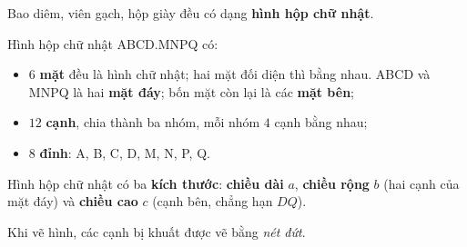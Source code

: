 \gdef\cuboidVT#1#2#3#4{\coordinate (Q) at (0,0); \coordinate (P) at (#1,0); \coordinate (C) at (#1,#3); \coordinate (D) at (0,#3);
 \coordinate (M) at ({0.5*#2},{0.38*#2}); \coordinate (N) at ($(P)+(M)$); \coordinate (B) at ($(C)+(M)$); \coordinate (A) at ($(D)+(M)$);
 \fill[tmBlue!6] (Q)--(P)--(C)--(D)--cycle; \fill[tmBlue!3] (D)--(C)--(B)--(A)--cycle; \fill[tmBlue!13] (P)--(N)--(B)--(C)--cycle;
 \ifdim #4pt>0pt \coordinate (wl) at (0,#4);
  \fill[cyan!30] (Q)--(P)--($(P)+(wl)$)--($(Q)+(wl)$)--cycle; \fill[cyan!45] (P)--(N)--($(N)+(wl)$)--($(P)+(wl)$)--cycle;
  \fill[cyan!16] ($(Q)+(wl)$)--($(P)+(wl)$)--($(N)+(wl)$)--($(M)+(wl)$)--cycle;
  \draw[cyan!60!black,line width=0.5pt] ($(Q)+(wl)$)--($(P)+(wl)$)--($(N)+(wl)$);
  \draw[cyan!60!black,line width=0.4pt,dashed] ($(N)+(wl)$)--($(M)+(wl)$)--($(Q)+(wl)$); \fi
 \draw[geo,dashed,line width=0.6pt] (M)--(Q) (M)--(N) (M)--(A);
 \draw[geo] (Q)--(P)--(C)--(D)--cycle (D)--(A)--(B)--(C) (P)--(N)--(B);}
\begin{knowbox}
\begin{minipage}[t]{0.58\linewidth}
Bao diêm, viên gạch, hộp giày đều có dạng \textbf{hình hộp chữ nhật}.\par
\smallskip
Hình hộp chữ nhật ABCD.MNPQ có:
\begin{itemize}[leftmargin=1.2em,itemsep=1pt,topsep=2pt]
\item $6$ \textbf{mặt} đều là hình chữ nhật; hai mặt đối diện thì bằng nhau. ABCD và MNPQ là hai \textbf{mặt đáy}; bốn mặt còn lại là các \textbf{mặt bên};
\item $12$ \textbf{cạnh}, chia thành ba nhóm, mỗi nhóm $4$ cạnh bằng nhau;
\item $8$ \textbf{đỉnh}: A, B, C, D, M, N, P, Q.
\end{itemize}
Hình hộp chữ nhật có ba \textbf{kích thước}: \textbf{chiều dài} $a$, \textbf{chiều rộng} $b$ (hai cạnh của mặt đáy) và \textbf{chiều cao} $c$ (cạnh bên, chẳng hạn $DQ$).\par
\smallskip
Khi vẽ hình, các cạnh bị khuất được vẽ bằng \emph{nét đứt}.
\end{minipage}\hfill
\begin{minipage}[t]{0.38\linewidth}\vspace{4pt}\centering
{}
\end{minipage}
\end{knowbox}
